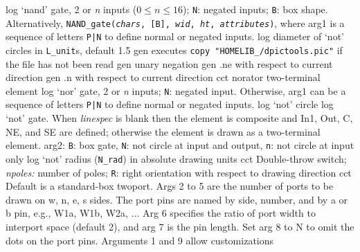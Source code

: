 %
  {log}%
  {`nand' gate, 2 or {\sl n\/} inputs ($0 \leq n \leq 16$);
   {\tt N}: negated inputs; {\tt B}: box shape.
   Alternatively, {\tt NAND\_gate({\sl chars}, [B], {\sl wid},
    {\sl ht}, {\sl attributes})}, where
   arg1 is a sequence of letters {\tt P|N} to define
   normal or negated inputs.
    }%
%
  {log}%
  {diameter of `not' circles in {\tt L\_unit}s, default 1.5}%
%
  {gen}%
  {executes {\tt copy "HOMELIB\_/dpictools.pic"} if the file has
  not been read}%
%
  {gen}%
  {unary negation}%
%
  {gen}%
  {.ne with respect to current direction}%
%
  {gen}%
  {.n with respect to current direction}%
%
  {cct}%
  { norator two-terminal element }%
%
  {log}%
  {`nor' gate, 2 or {\sl n\/} inputs; {\tt N}: negated input.
   Otherwise, arg1 can be a sequence of letters {\tt P|N} to define
   normal or negated inputs.
    }%
%
  {log}%
  {`not' circle}%
%
  {log}%
  {`not' gate.
   When {\sl linespec} is blank then the element is composite and In1,
   Out, C, NE, and SE are defined; otherwise the element is drawn as a
   two-terminal element. arg2: {\tt B}: box gate, {\tt N}: not circle at
   input and output, {\tt n}: not circle at input only
    }%
%
  {log}%
  {`not' radius ({\tt N\_rad}) in absolute drawing units}%
%
  {cct}%
  {Double-throw switch; {\sl npoles:} number of poles;
   {\tt R}: right orientation with respect to drawing direction
   }%
%
  {cct}%
  { Default is a standard-box twoport.  Args 2 to 5 are
    the number of ports to be drawn on w, n, e, s sides.  The port pins
    are named by side, number, and by a or b pin, e.g., W1a, W1b, W2a,
    $\ldots$ Arg 6 specifies the ratio of port width to interport space
    (default 2), and arg 7 is the pin length.  Set arg 8 to N to omit
    the dots on the port pins. Arguments 1 and 9 allow customizations
   }%
